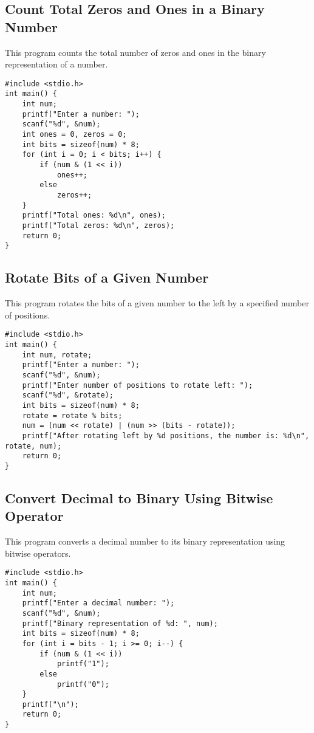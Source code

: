 \documentclass[a4paper,12pt]{article}
\begin{document}
\newpage

\subsection{Count Total Zeros and Ones in a Binary Number}
This program counts the total number of zeros and ones in the binary representation of a number.

\begin{lstlisting}[caption={Count Total Zeros and Ones in a Binary Number}]
#include <stdio.h>
int main() {
    int num;
    printf("Enter a number: ");
    scanf("%d", &num);
    int ones = 0, zeros = 0;
    int bits = sizeof(num) * 8;
    for (int i = 0; i < bits; i++) {
        if (num & (1 << i))
            ones++;
        else
            zeros++;
    }
    printf("Total ones: %d\n", ones);
    printf("Total zeros: %d\n", zeros);
    return 0;
}
\end{lstlisting}

\newpage

\subsection{Rotate Bits of a Given Number}
This program rotates the bits of a given number to the left by a specified number of positions.

\begin{lstlisting}[caption={Rotate Bits of a Given Number}]
#include <stdio.h>
int main() {
    int num, rotate;
    printf("Enter a number: ");
    scanf("%d", &num);
    printf("Enter number of positions to rotate left: ");
    scanf("%d", &rotate);
    int bits = sizeof(num) * 8;
    rotate = rotate % bits;
    num = (num << rotate) | (num >> (bits - rotate));
    printf("After rotating left by %d positions, the number is: %d\n", rotate, num);
    return 0;
}
\end{lstlisting}

\newpage

\subsection{Convert Decimal to Binary Using Bitwise Operator}
This program converts a decimal number to its binary representation using bitwise operators.

\begin{lstlisting}[caption={Convert Decimal to Binary Using Bitwise Operator}]
#include <stdio.h>
int main() {
    int num;
    printf("Enter a decimal number: ");
    scanf("%d", &num);
    printf("Binary representation of %d: ", num);
    int bits = sizeof(num) * 8;
    for (int i = bits - 1; i >= 0; i--) {
        if (num & (1 << i))
            printf("1");
        else
            printf("0");
    }
    printf("\n");
    return 0;
}
\end{lstlisting}
\end{document}
